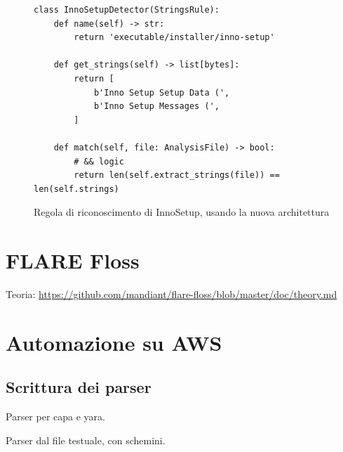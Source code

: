 \begin{figure}[H]
    \centering
    \begin{verbatim}
class InnoSetupDetector(StringsRule):
    def name(self) -> str:
        return 'executable/installer/inno-setup'

    def get_strings(self) -> list[bytes]:
        return [
            b'Inno Setup Setup Data (',
            b'Inno Setup Messages (',
        ]

    def match(self, file: AnalysisFile) -> bool:
        # && logic
        return len(self.extract_strings(file)) == len(self.strings)
    \end{verbatim}
    \caption{Regola di riconoscimento di InnoSetup, usando la nuova architettura}
    \label{fig:enter-label}
\end{figure}

\section{FLARE Floss}
Teoria: \url{https://github.com/mandiant/flare-floss/blob/master/doc/theory.md}

\section{Automazione su AWS}

\subsection{Scrittura dei parser}
Parser per capa e yara.

Parser dal file testuale, con schemini.

